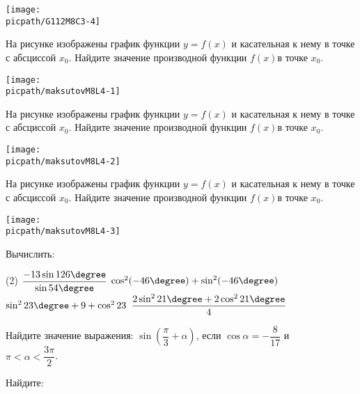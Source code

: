 \begin{class}[number=4]
\begin{listofex}
\begin{minipage}[t]{\picwidth}
			\texttt{[image: \\picpath/G112M8C3-4]}
		\end{minipage}
		\item
		\begin{minipage}[t]{\bodywidth}
			На рисунке изображены график функции \(y=f(x)\) и касательная к нему в точке с абсциссой \(x_0\). Найдите значение производной функции \(f(x)\)в точке \(x_0\).
		\end{minipage}
		\hspace{0.02\linewidth}
		\begin{minipage}[t]{\picwidth}
			\texttt{[image: \\picpath/maksutovM8L4-1]}
		\end{minipage}
		\item
		\begin{minipage}[t]{\bodywidth}
			На рисунке изображены график функции \(y=f(x)\) и касательная к нему в точке с абсциссой \(x_0\). Найдите значение производной функции \(f(x)\)в точке \(x_0\).
		\end{minipage}
		\hspace{0.02\linewidth}
		\begin{minipage}[t]{\picwidth}
			\texttt{[image: \\picpath/maksutovM8L4-2]}
		\end{minipage}
		\item
		\begin{minipage}[t]{\bodywidth}
			На рисунке изображены график функции \(y=f(x)\) и касательная к нему в точке с абсциссой \(x_0\). Найдите значение производной функции \(f(x)\)в точке \(x_0\).
		\end{minipage}
		\hspace{0.02\linewidth}
		\begin{minipage}[t]{\picwidth}
			\texttt{[image: \\picpath/maksutovM8L4-3]}
		\end{minipage}
		
		
		\item Вычислить:
		\begin{tasks}(2)
			\task \( \dfrac{-13\sin126\degree}{\sin54\degree} \)
			\task \( \cos^2(-46\degree)+\sin^2(-46\degree) \)
			\task \( \sin^223\degree+9+\cos^223 \)
			\task \( \dfrac{2\sin^221\degree+2\cos^221\degree}{4} \)
		\end{tasks}
		\item Найдите значение выражения: \( \sin\left( \dfrac{\pi}{3}+\alpha \right) \), если \( \cos\alpha=-\dfrac{8}{17} \) и \\ \( \pi<\alpha<\dfrac{3\pi}{2} \).
		\item Найдите: %
		\begin{tasks}
			

\end{tasks}
\end{listofex}
\end{class}
